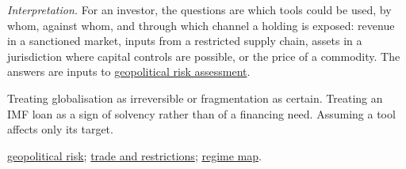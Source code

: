 \begin{qfdefinition}
 \emph{Interpretation.} For an investor, the questions are which tools could be used, by whom, against whom, and through which channel a holding is exposed: revenue in a sanctioned market, inputs from a restricted supply chain, assets in a jurisdiction where capital controls are possible, or the price of a commodity. The answers are inputs to \hyperref[meth:geopolitical-risk-assessment]{geopolitical risk assessment}.

 Treating globalisation as irreversible or fragmentation as certain. Treating an IMF loan as a sign of solvency rather than of a financing need. Assuming a tool affects only its target.

 \hyperref[meth:geopolitical-risk-assessment]{geopolitical risk}; \hyperref[meth:trade-benefits-restrictions-blocs]{trade and restrictions}; \hyperref[def:macro-regime-asset-map]{regime map}.

\end{qfdefinition}

